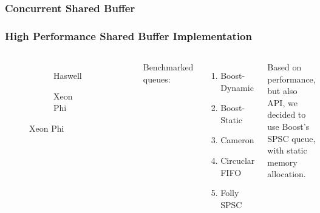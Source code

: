 \subsubsection*{Concurrent Shared Buffer}
\begin{frame}
	\frametitle{High Performance Shared Buffer Implementation}
	\begin{columns}[c]
	\begin{figure}[h]
		\begin{subfigure}{0.49\textwidth}
			\label{fig:bench-queue-haswell-concurrent}
			\caption*{Haswell}
		\end{subfigure}
		\begin{subfigure}{0.49\textwidth}
			\label{fig:bench-queue-phi-concurrent}
			\caption*{Xeon Phi}
	\end{subfigure}
	\end{figure}

	Benchmarked queues:\small{\begin{enumerate}
		\item Boost-Dynamic \footnotemark
		\item Boost-Static
		\item Cameron \footnotemark
		\item Circuclar FIFO \footnotemark 
		\item Folly SPSC \footnotemark
	\end{enumerate}}
	Based on performance, but also API, we decided to use Boost's SPSC queue, with static memory allocation.
	\end{columns}
\end{frame}


